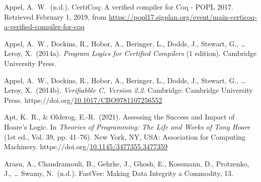 \documentclass[12pt,twoside]{article}
\begin{document}
{\begin{thebibliography}{1079}
\mdbibitemlabel{}Appel, A.~W.~(n.d.). CertiCoq: A verified compiler for Coq - POPL 2017. Retrieved February 1, 2019, from \href{https://popl17.sigplan.org/event/main-certicoq-a-verified-compiler-for-coq}{{\ttfamily https://\hspace{0pt}popl17.\hspace{0pt}sigplan.\hspace{0pt}org/\hspace{0pt}event/\hspace{0pt}main-\hspace{0pt}certicoq-\hspace{0pt}a-\hspace{0pt}verified-\hspace{0pt}compiler-\hspace{0pt}for-\hspace{0pt}coq}}%

\mdbibitemlabel{}Appel, A.~W., Dockins, R., Hobor, A., Beringer, L., Dodds, J., Stewart, G., … Leroy, X.~(2014a). \emph{Program Logics for Certified Compilers} (1 edition). Cambridge University Press.%

\mdbibitemlabel{}Appel, A.~W., Dockins, R., Hobor, A., Beringer, L., Dodds, J., Stewart, G., … Leroy, X.~(2014b). \emph{Verifiabble C, Version 2.2}. Cambridge: Cambridge University Press. https://doi.org/\href{https://dx.doi.org/10.1017/CBO9781107256552}{10.1017/CBO9781107256552}%

\mdbibitemlabel{}Apt, K.~R., \& Olderog, E.-R.~(2021). Assessing the Success and Impact of Hoare’s Logic. In \emph{Theories of Programming: The Life and Works of Tony Hoare} (1st ed., Vol. 39, pp. 41–76). New York, NY, USA: Association for Computing Machinery. https://doi.org/\href{https://dx.doi.org/10.1145/3477355.3477359}{10.1145/3477355.3477359}%

\mdbibitemlabel{}Arasu, A., Chandramouli, B., Gehrke, J., Ghosh, E., Kossmann, D., Protzenko, J., … Swamy, N.~(n.d.). FastVer: Making Data Integrity a Commodity, 13.%


\end{thebibliography}}
\end{document}
